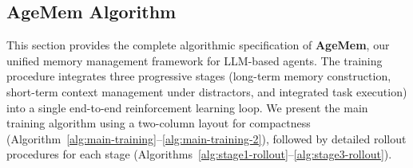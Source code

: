 

\subsection{AgeMem Algorithm}
\label{app:algorithm}

This section provides the complete algorithmic specification of \textbf{AgeMem}, our unified memory management framework for LLM-based agents. The training procedure integrates three progressive stages (long-term memory construction, short-term context management under distractors, and integrated task execution) into a single end-to-end reinforcement learning loop. We present the main training algorithm using a two-column layout for compactness (Algorithm~\ref{alg:main-training}--\ref{alg:main-training-2}), followed by detailed rollout procedures for each stage (Algorithms~\ref{alg:stage1-rollout}--\ref{alg:stage3-rollout}).

